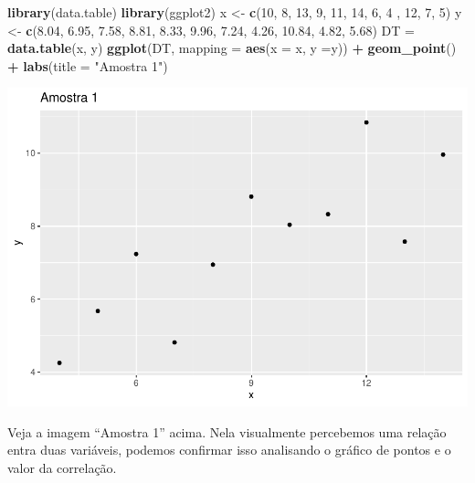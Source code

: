 \documentclass[
]{book}
\newenvironment{Shaded}{\begin{snugshade}}{\end{snugshade}}
\newcommand{\AttributeTok}[1]{\textcolor[rgb]{0.13,0.29,0.53}{#1}}
\newcommand{\DecValTok}[1]{\textcolor[rgb]{0.00,0.00,0.81}{#1}}
\newcommand{\FloatTok}[1]{\textcolor[rgb]{0.00,0.00,0.81}{#1}}
\newcommand{\FunctionTok}[1]{\textcolor[rgb]{0.13,0.29,0.53}{\textbf{#1}}}
\newcommand{\NormalTok}[1]{#1}
\newcommand{\OtherTok}[1]{\textcolor[rgb]{0.56,0.35,0.01}{#1}}
\newcommand{\SpecialCharTok}[1]{\textcolor[rgb]{0.81,0.36,0.00}{\textbf{#1}}}
\newcommand{\StringTok}[1]{\textcolor[rgb]{0.31,0.60,0.02}{#1}}
\begin{document}
\begin{Shaded}
\begin{Highlighting}[]
\FunctionTok{library}\NormalTok{(data.table)}
\FunctionTok{library}\NormalTok{(ggplot2)}
\NormalTok{x }\OtherTok{\textless{}{-}} \FunctionTok{c}\NormalTok{(}\DecValTok{10}\NormalTok{, }\DecValTok{8}\NormalTok{, }\DecValTok{13}\NormalTok{, }\DecValTok{9}\NormalTok{, }\DecValTok{11}\NormalTok{, }\DecValTok{14}\NormalTok{, }\DecValTok{6}\NormalTok{, }\DecValTok{4}\NormalTok{ , }\DecValTok{12}\NormalTok{, }\DecValTok{7}\NormalTok{, }\DecValTok{5}\NormalTok{)}
\NormalTok{y }\OtherTok{\textless{}{-}} \FunctionTok{c}\NormalTok{(}\FloatTok{8.04}\NormalTok{, }\FloatTok{6.95}\NormalTok{, }\FloatTok{7.58}\NormalTok{, }\FloatTok{8.81}\NormalTok{, }\FloatTok{8.33}\NormalTok{, }\FloatTok{9.96}\NormalTok{, }\FloatTok{7.24}\NormalTok{, }\FloatTok{4.26}\NormalTok{, }\FloatTok{10.84}\NormalTok{, }\FloatTok{4.82}\NormalTok{, }\FloatTok{5.68}\NormalTok{)}
\NormalTok{DT }\OtherTok{=} \FunctionTok{data.table}\NormalTok{(x, y)}
\FunctionTok{ggplot}\NormalTok{(DT, }\AttributeTok{mapping =} \FunctionTok{aes}\NormalTok{(}\AttributeTok{x =}\NormalTok{ x, }\AttributeTok{y =}\NormalTok{y)) }\SpecialCharTok{+}
  \FunctionTok{geom\_point}\NormalTok{() }\SpecialCharTok{+}
  \FunctionTok{labs}\NormalTok{(}\AttributeTok{title =} \StringTok{"Amostra 1"}\NormalTok{)}
\end{Highlighting}
\end{Shaded}

\includegraphics{_main_files/figure-latex/unnamed-chunk-7-1.pdf}

Veja a imagem ``Amostra 1'' acima. Nela visualmente percebemos uma relação entra duas variáveis, podemos confirmar isso analisando o gráfico de pontos e o valor da correlação.
\end{document}
